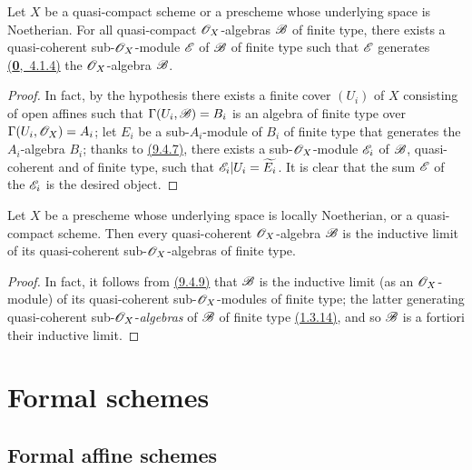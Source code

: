 \begin{prop}[9.6.5]
\label{prop-1.9.6.5}
Let $X$ be a quasi-compact scheme or a prescheme whose underlying space is Noetherian.
For all quasi-compact $\mathscr{O}_X$-algebras $\mathscr{B}$ of finite type, there exists a quasi-coherent sub-$\mathscr{O}_X$-module $\mathscr{E}$ of $\mathscr{B}$ of finite type such that $\mathscr{E}$ generates \hyperref[env-0.4.1.4]{(\textbf{0},~4.1.4)} the $\mathscr{O}_X$-algebra $\mathscr{B}$.
\end{prop}

\begin{proof}
\label{proof-prop-1.9.6.5}
In fact, by the hypothesis there exists a finite cover $(U_i)$ of $X$ consisting of open affines such that $\Gamma(U_i,\mathscr{B})=B_i$ is an algebra of finite type over $\Gamma(U_i,\mathscr{O}_X)=A_i$; let $E_i$ be a sub-$A_i$-module of $B_i$ of finite type that generates the $A_i$-algebra $B_i$; thanks to \hyperref[thm-1.9.4.7]{(9.4.7)}, there exists a sub-$\mathscr{O}_X$-module $\mathscr{E}_i$ of $\mathscr{B}$, quasi-coherent and of finite type, such that $\mathscr{E}_i|U_i=\widetilde{E_i}$.
It is clear that the sum $\mathscr{E}$ of the $\mathscr{E}_i$ is the desired object.
\end{proof}

\begin{prop}[9.6.6]
\label{prop-1.9.6.6}
Let $X$ be a prescheme whose underlying space is locally Noetherian, or a quasi-compact scheme.
Then every quasi-coherent $\mathscr{O}_X$-algebra $\mathscr{B}$ is the inductive limit of its quasi-coherent sub-$\mathscr{O}_X$-algebras of finite type.
\end{prop}

\begin{proof}
\label{proof-prop-1.9.6.6}
In fact, it follows from \hyperref[cor-1.9.4.9]{(9.4.9)} that $\mathscr{B}$ is the inductive limit (as an $\mathscr{O}_X$-module) of its quasi-coherent sub-$\mathscr{O}_X$-modules of finite type; the latter generating quasi-coherent sub-$\mathscr{O}_X$-\emph{algebras} of $\mathscr{B}$ of finite type \hyperref[env-1.1.3.14]{(1.3.14)}, and so $\mathscr{B}$ is a fortiori their inductive limit.
\end{proof}

\section{Formal schemes}
\label{section-formal-schemes}

\subsection{Formal affine schemes}
\label{subsection-formal-affine-schemes}

